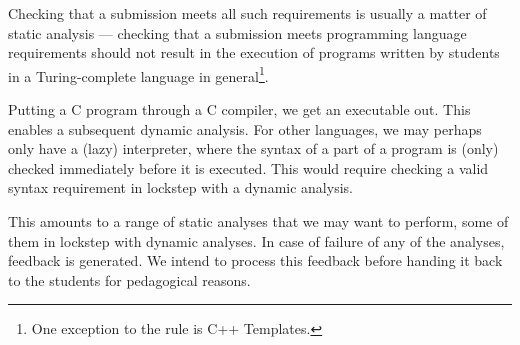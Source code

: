 Checking that a submission meets all such requirements is usually a matter of
static analysis --- checking that a submission meets programming language
requirements should not result in the execution of programs written by students
in a Turing-complete language in general\footnote{One exception to the rule is
C++ Templates\cite{veldhuizen-2003}.}.

Putting a C program through a C compiler, we get an executable out. This
enables a subsequent dynamic analysis. For other languages, we may perhaps only
have a (lazy) interpreter, where the syntax of a part of a program is (only)
checked immediately before it is executed. This would require checking a valid
syntax requirement in lockstep with a dynamic analysis.

This amounts to a range of static analyses that we may want to perform, some of
them in lockstep with dynamic analyses. In case of failure of any of the
analyses, feedback is generated. We intend to process this feedback before
handing it back to the students for pedagogical reasons.
